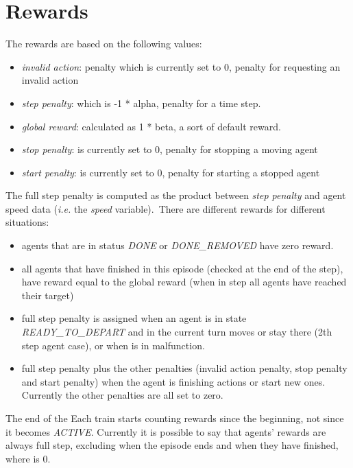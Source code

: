 \section{Rewards}
\label{sec:envRewards}
The rewards are based on the following values:
\begin{itemize}
\item \textit{invalid action}: penalty which is currently set to 0, penalty for requesting an invalid action
\item \textit{step penalty}: which is -1 * alpha, penalty for a time step.
\item \textit{global reward}: calculated as 1 * beta, a sort of default reward.
\item \textit{stop penalty}: is currently set to 0, penalty for stopping a moving agent
\item \textit{start penalty}: is currently set to 0, penalty for starting a stopped agent
\end{itemize}
The full step penalty is computed as the product between \textit{step penalty} and agent speed data (\textit{i.e.} the \textit{speed} variable).\
There are different rewards for different situations:
\begin{itemize}
\item agents that are in status \textit{DONE} or \textit{DONE\_REMOVED} have zero reward.
\item all agents that have finished in this episode (checked at the end of the step), have reward equal to the global reward (when in step all agents have reached their target)

\item full step penalty is assigned when an agent is in state \textit{READY\_TO\_DEPART} and in the current turn moves or stay there (2th step agent case), or when is in malfunction.
\item full step penalty plus the other penalties (invalid action penalty, stop penalty and start penalty) when the agent is finishing actions or start new ones. Currently the other penalties are all set to zero.
\end{itemize}
The end of the Each train starts counting rewards since the beginning, not since it becomes \textit{ACTIVE}. Currently it is possible to say that agents’ rewards are always full step, excluding when the episode ends and when they have finished, where is 0.

